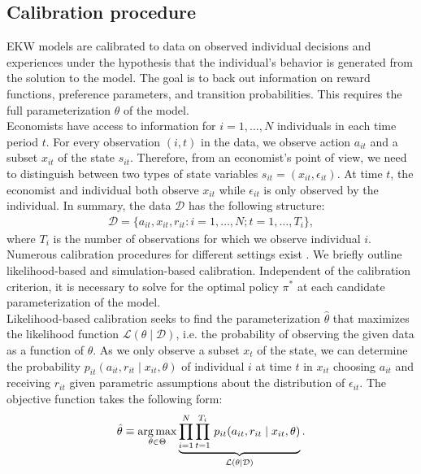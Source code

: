 \subsection{Calibration procedure}
EKW models are calibrated to data on observed individual decisions and experiences under the hypothesis that the individual's behavior is generated from the solution to the model. The goal is to back out information on reward functions, preference parameters, and transition probabilities. This requires the full parameterization $\theta$ of the model.\\

\noindent Economists have access to information for $i = 1, \hdots, N$ individuals in each time period $t$. For every observation $(i, t)$ in the data, we observe action $a_{it}$ and a subset $x_{it}$ of the state $s_{it}$. Therefore, from an economist's point of view, we need to distinguish between two types of state variables $s_{it} = (x_{it}, \epsilon_{it})$. At time $t$, the economist and individual both observe $x_{it}$ while $\epsilon_{it}$ is only observed by the individual. In summary, the data $\mathcal{D}$ has the following structure:
%
\begin{align*}
  \mathcal{D} = \{a_{it}, x_{it}, r_{it}: i = 1, \hdots, N; t = 1, \hdots, T_i\},
\end{align*}
where $T_i$ is the number of observations for which we observe individual $i$.\\

\noindent Numerous calibration procedures for different settings exist \citep{Davidson.2003, Gourieroux.1996}. We briefly outline likelihood-based and simulation-based calibration. Independent of the calibration criterion, it is necessary to solve for the optimal policy $\pi^*$ at each candidate parameterization of the model.\\

\noindent Likelihood-based calibration seeks to find the parameterization $\hat{\theta}$ that maximizes the likelihood function $\mathcal{L}(\theta\mid\mathcal{D})$, i.e. the probability of observing the given data as a function of $\theta$. As we only observe a subset $x_t$ of the state, we can determine the probability $p_{it}(a_{it}, r_{it} \mid x_{it}, \theta)$ of individual $i$ at time $t$ in $x_{it}$ choosing $a_{it}$ and receiving $r_{it}$ given parametric assumptions about the distribution of $\epsilon_{it}$. The objective function takes the following form:
%
\begin{align*}
  \hat{\theta} \equiv \operatorname*{arg\,max}_{\theta \in \Theta}  \underbrace{\prod^N_{i= 1} \prod^{T_i}_{t= 1}\, p_{it}(a_{it}, r_{it} \mid x_{it}, \theta)}_{\mathcal{L}(\theta\mid\mathcal{D})}.
\end{align*}

